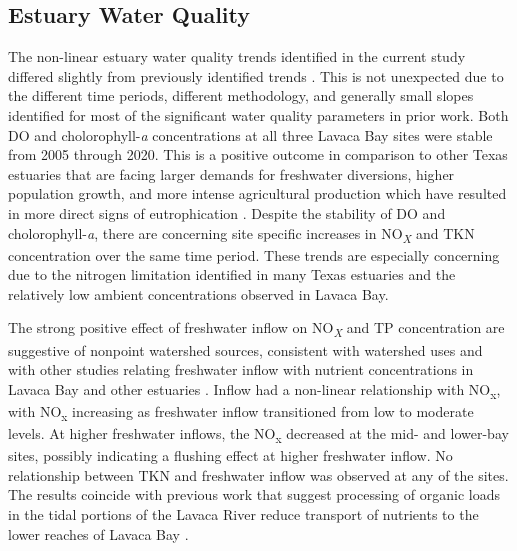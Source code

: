 \documentclass[fleqn,10pt,lineno]{wlpeerj} %
\begin{document}
\hypertarget{estuary-water-quality}{%
\subsection*{Estuary Water Quality}\label{estuary-water-quality}}

The non-linear estuary water quality trends identified in the current
study differed slightly from previously identified trends
\autocite{bugica_water_2020}. This is not unexpected due to the
different time periods, different methodology, and generally small
slopes identified for most of the significant water quality parameters
in prior work. Both DO and cholorophyll-\emph{a} concentrations at all
three Lavaca Bay sites were stable from 2005 through 2020. This is a
positive outcome in comparison to other Texas estuaries that are facing
larger demands for freshwater diversions, higher population growth, and
more intense agricultural production which have resulted in more direct
signs of eutrophication
\autocite{wetzWaterQualityDynamics2016,bugica_water_2020}. Despite the
stability of DO and cholorophyll-\emph{a}, there are concerning site
specific increases in NO\textsubscript{\emph{X}} and TKN concentration
over the same time period. These trends are especially concerning due to
the nitrogen limitation identified in many Texas estuaries
\autocite{gardnerNitrogenFixationDissimilatory2006,houTransformationFateNitrate2012,doradoUnderstandingInteractionsFreshwater2015,paudelRelationshipSuspendedSolids2019,wetz_exceptionally_2017}
and the relatively low ambient concentrations observed in Lavaca Bay.

The strong positive effect of freshwater inflow on
NO\textsubscript{\emph{X}} and TP concentration are suggestive of
nonpoint watershed sources, consistent with watershed uses and with
other studies relating freshwater inflow with nutrient concentrations in
Lavaca Bay and other estuaries
\autocite{russell_effect_2006,caffreyHighNutrientPulses2007,peierlsNonmonotonicResponsesPhytoplankton2012,palmerImpactsDroughtsLow2015,ciraPhytoplanktonDynamicsLowinflow2021}.
Inflow had a non-linear relationship with NO\textsubscript{x}, with
NO\textsubscript{x} increasing as freshwater inflow transitioned from
low to moderate levels. At higher freshwater inflows, the
NO\textsubscript{x} decreased at the mid- and lower-bay sites, possibly
indicating a flushing effect at higher freshwater inflow. No
relationship between TKN and freshwater inflow was observed at any of
the sites. The results coincide with previous work that suggest
processing of organic loads in the tidal portions of the Lavaca River
reduce transport of nutrients to the lower reaches of Lavaca Bay
\autocite{russell_effect_2006}.
\end{document}
